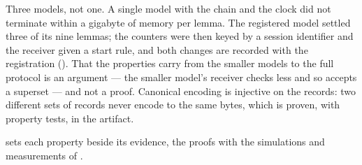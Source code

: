 Three models, not one. A single model with the chain and the clock did not terminate within a
gigabyte of memory per lemma. The registered model settled three of its nine lemmas; the counters
were then keyed by a session identifier and the receiver given a start rule, and both changes
are recorded with the registration (). That the properties carry from the
smaller models to the full protocol is an argument --- the smaller model's receiver checks less
and so accepts a superset --- and not a proof. Canonical encoding is injective on the records:
two different sets of records never encode to the same bytes, which is proven, with property
tests, in the artifact.

 sets each property beside its evidence, the proofs with the simulations and
measurements of .

